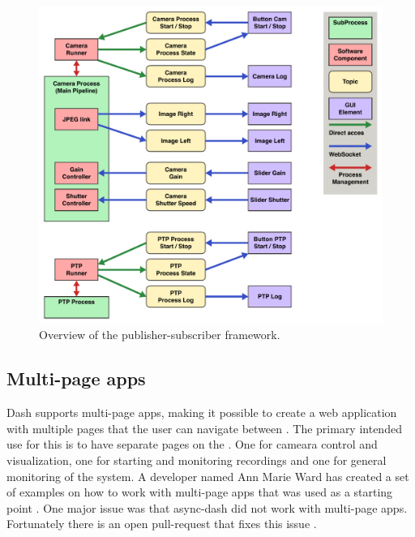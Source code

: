 \begin{figure}[H]
    \centering
    \includegraphics[width=\textwidth]{figures/gui/pubsub_graph.pdf}
    \caption{Overview of the publisher-subscriber framework.}
    \label{fig:pub_sub_graph}
\end{figure}

\subsection{Multi-page apps}
Dash supports multi-page apps, making it possible to create a web application with multiple pages that the user can navigate between \cite{plotlyMultiPageAppsURL}.
The primary intended use for this is to have separate pages on the \srgui.
One for cameara control and visualization, one for starting and monitoring recordings and one for general monitoring of the system.
A developer named Ann Marie Ward has created a set of examples on how to work with multi-page apps that was used as a starting point \cite{wardExamplesMultipageApps03Jul22}.
One major issue was that \gls{async-dash} did not work with multi-page apps.
Fortunately there is an open pull-request that fixes this issue \cite{lekAddFlaskRequest2022}.